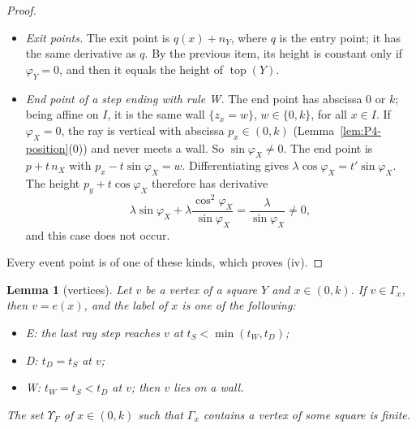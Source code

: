 \documentclass[11pt]{amsart}
\newcommand{\Top}{\operatorname{top}}
\newtheorem{lemma}[theorem]{Lemma}
\theoremstyle{definition}
\theoremstyle{remark}
\numberwithin{equation}{section}
\begin{document}
\begin{proof}
\begin{itemize}
\begin{itemize}
 \end{itemize}
\item \emph{Exit points.} The exit point is $q(x)+n_Y$, where $q$ is the entry point; it has the same derivative as $q$. By the previous item, its height is constant only if $\varphi_Y=0$, and then it equals the height of $\Top(Y)$.
\item \emph{End point of a step ending with rule W.} The end point has abscissa $0$ or $k$; being affine on $I$, it is the same wall $\{z_x=w\}$, $w\in\{0,k\}$, for all $x\in I$. If $\varphi_X=0$, the ray is vertical with abscissa $p_x\in(0,k)$ (Lemma~\ref{lem:P4-position}(0)) and never meets a wall. So $\sin\varphi_X\ne0$. The end point is $p+t\,n_X$ with $p_x-t\sin\varphi_X=w$. Differentiating gives $\lambda\cos\varphi_X=t'\sin\varphi_X$. The height $p_y+t\cos\varphi_X$ therefore has derivative
\[
\lambda\sin\varphi_X+\lambda\frac{\cos^2\varphi_X}{\sin\varphi_X}=\frac{\lambda}{\sin\varphi_X}\ne0 ,
\]
and this case does not occur.
\end{itemize}
Every event point is of one of these kinds, which proves (iv).
\end{proof}

\begin{lemma}[vertices]\label{lem:P4-vertex}
Let $v$ be a vertex of a square $Y$ and $x\in(0,k)$. If $v\in\Gamma_x$, then $v=e(x)$, and the label of $x$ is one of the following:
\begin{itemize}
\item E: the last ray step reaches $v$ at $t_S<\min(t_W,t_D)$;
\item D: $t_D=t_S$ at $v$;
\item W: $t_W=t_S<t_D$ at $v$; then $v$ lies on a wall.
\end{itemize}
The set $\Upsilon_F$ of $x\in(0,k)$ such that $\Gamma_x$ contains a vertex of some square is finite.
\end{lemma}
\end{document}
